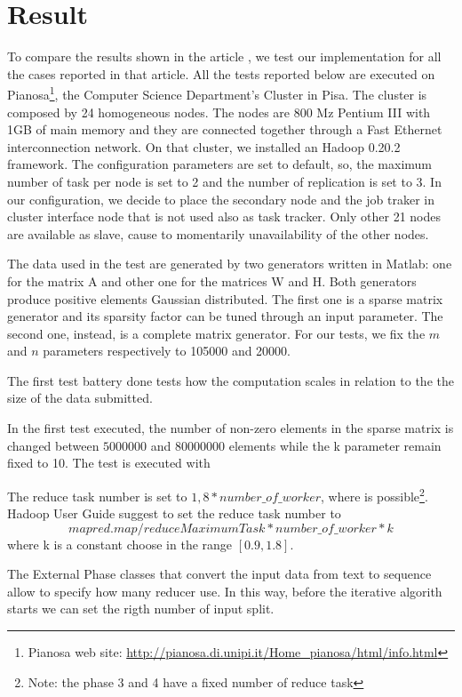 \section{Result}
\label{result}

To compare the results shown in the article \cite{liu2010}, we test our implementation for all the cases reported in that article. All the tests reported below are executed on Pianosa\footnote{Pianosa web site: \url{http://pianosa.di.unipi.it/Home_pianosa/html/info.html}}, the Computer Science Department's Cluster in Pisa. The cluster is composed by 24 homogeneous nodes. The nodes are 800 Mz Pentium III with 1GB of main memory and they are connected together through a Fast Ethernet interconnection network. On that cluster, we installed an Hadoop 0.20.2 framework. The configuration parameters are set to default, so, the maximum number of task per node is set to 2 and the number of replication is set to 3. In our configuration, we decide to place the secondary node and the job traker in cluster interface node that is not used also as task tracker. Only other 21 nodes are available as slave, cause to momentarily unavailability of the other nodes.

The data used in the test are generated by two generators written in Matlab: one for the matrix A and other one for the matrices W and H. Both generators produce positive elements Gaussian distributed. The first one is a sparse matrix generator and its sparsity factor can be tuned through an input parameter. The second one, instead, is a complete matrix generator. For our tests, we fix the $m$ and $n$ parameters respectively to 105000 and 20000.

The first test battery done tests how the computation scales in relation to the the size of the data submitted. 

In the first test executed, the number of non-zero elements in the sparse matrix is changed between $5000000$ and $80000000$ elements while the k parameter remain fixed to 10. The test is executed with 


The reduce task number is set to $ 1,8 * number\_of\_worker$, where is possible\footnote{Note: the phase 3 and 4 have a fixed number of reduce task}. Hadoop User Guide suggest to set the reduce task number to $$ mapred.map/reduceMaximumTask * number\_of\_worker * k $$ where k is a constant choose in the range $[ 0.9, 1.8]$.


The External Phase classes that convert the input data from text to sequence allow to specify how many reducer use. In this way, before the iterative algorith starts we can set the rigth number of input split.



